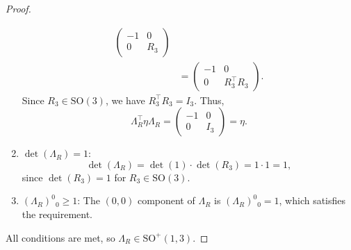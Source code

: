 \documentclass{amsart}
\theoremstyle{definition}
\theoremstyle{remark}
\begin{document}
\begin{proof}
\begin{enumerate}
\begin{align*}
          \begin{pmatrix}
            -1 & 0 \\
            0 & R_3
          \end{pmatrix} \\
          &=
          \begin{pmatrix}
            -1 & 0 \\
            0 & R_3^\top R_3
          \end{pmatrix}.
        \end{align*}
      Since $R_3 \in \mathrm{SO}(3)$, we have $R_3^\top R_3 = I_3$. Thus,
      \begin{equation*}
        \Lambda_R^\top\eta \Lambda_R =
        \begin{pmatrix}
          -1 & 0 \\
          0 & I_3
        \end{pmatrix}
        = \eta.
      \end{equation*}
      \item $\det(\Lambda_R) = 1$:
      \begin{equation*}
        \det(\Lambda_R) = \det(1) \cdot \det(R_3) = 1 \cdot 1 = 1,
      \end{equation*}
      since $\det(R_3)=1$ for $R_3 \in \mathrm{SO}(3)$.
      \item $(\Lambda_R)^0{}_0 \geq 1$:
      The $(0,0)$ component of $\Lambda_R$ is $(\Lambda_R)^0{}_0 = 1$, which satisfies the requirement.
  \end{enumerate}
  All conditions are met, so $\Lambda_R \in \mathrm{SO}^+(1,3)$.
\end{proof}
\end{document}

